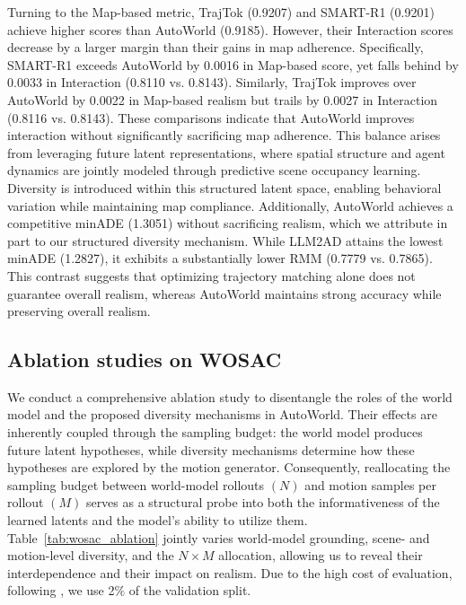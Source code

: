 \documentclass[runningheads]{llncs}
\begin{document}
Turning to the Map-based metric, TrajTok (0.9207) and SMART-R1 (0.9201) achieve higher scores than AutoWorld (0.9185). However, their Interaction scores decrease by a larger margin than their gains in map adherence. Specifically, SMART-R1 exceeds AutoWorld by 0.0016 in Map-based score, yet falls behind by 0.0033 in Interaction (0.8110 vs. 0.8143). Similarly, TrajTok improves over AutoWorld by 0.0022 in Map-based realism but trails by 0.0027 in Interaction (0.8116 vs. 0.8143). These comparisons indicate that AutoWorld improves interaction without significantly sacrificing map adherence. This balance arises from leveraging future latent representations, where spatial structure and agent dynamics are jointly modeled through predictive scene occupancy learning. Diversity is introduced within this structured latent space, enabling behavioral variation while maintaining map compliance. Additionally, AutoWorld achieves a competitive minADE (1.3051) without sacrificing realism, which we attribute in part to our structured diversity mechanism. While LLM2AD attains the lowest minADE (1.2827), it exhibits a substantially lower RMM (0.7779 vs. 0.7865). This contrast suggests that optimizing trajectory matching alone does not guarantee overall realism, whereas AutoWorld maintains strong accuracy while preserving overall realism.


\vspace{-2.7mm}

\subsection{Ablation studies on WOSAC}
We conduct a comprehensive ablation study to disentangle the roles of the world model and the proposed diversity mechanisms in AutoWorld. Their effects are inherently coupled through the sampling budget: the world model produces future latent hypotheses, while diversity mechanisms determine how these hypotheses are explored by the motion generator. Consequently, reallocating the sampling budget between world-model rollouts $(N)$ and motion samples per rollout $(M)$ serves as a structural probe into both the informativeness of the learned latents and the model’s ability to utilize them. Table~\ref{tab:wosac_ablation} jointly varies world-model grounding, scene- and motion-level diversity, and the $N\times M$ allocation, allowing us to reveal their interdependence and their impact on realism. Due to the high cost of evaluation, following \cite{zhang2025closed,pei2025advancing,DecompGAIL2026}, we use 2$\%$ of the validation split.
\end{document}
